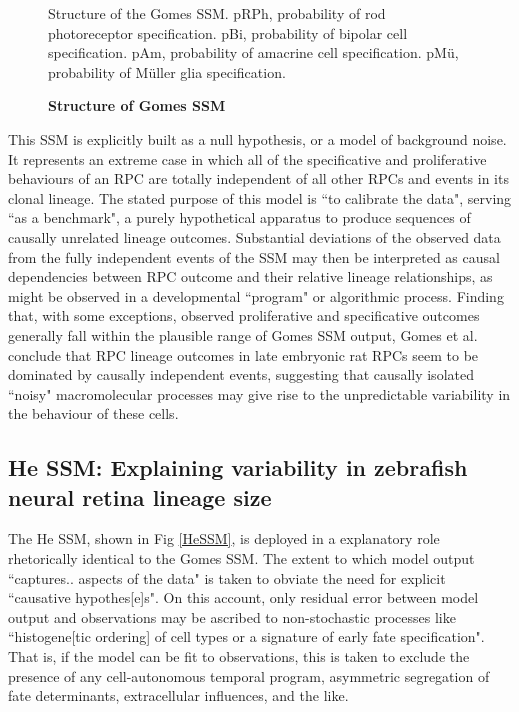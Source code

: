 \begin{figure}[!h]
\caption{{\bf Structure of Gomes SSM}}
Structure of the Gomes SSM. pRPh, probability of rod photoreceptor specification. pBi, probability of bipolar cell specification. pAm, probability of amacrine cell specification. pM{\"u}, probability of M{\"u}ller glia specification.
\label{GomesSSM}
\end{figure}
 
This SSM is explicitly built as a null hypothesis, or a model of background noise. It represents an extreme case in which all of the specificative and proliferative behaviours of an RPC are totally independent of all other RPCs and events in its clonal lineage. The stated purpose of this model is ``to calibrate the data", serving ``as a benchmark"\cite{Gomes2011}, a purely hypothetical apparatus to produce sequences of causally unrelated lineage outcomes. Substantial deviations of the observed data from the fully independent events of the SSM may then be interpreted as causal dependencies between RPC outcome and their relative lineage relationships, as might be observed in a developmental ``program" or algorithmic process. Finding that, with some exceptions, observed proliferative and specificative outcomes generally fall within the plausible range of Gomes SSM output, Gomes et al. conclude that RPC lineage outcomes in late embryonic rat RPCs seem to be dominated by causally independent events, suggesting that causally isolated ``noisy" macromolecular processes may give rise to the unpredictable variability in the behaviour of these cells. 
 
 \subsection{He SSM: Explaining variability in zebrafish neural retina lineage size}
 
The He SSM, shown in Fig \ref{HeSSM}, is deployed in a explanatory role rhetorically identical to the Gomes SSM. The extent to which model output ``captures.. aspects of the data" is taken to obviate the need for explicit ``causative hypothes[e]s". On this account, only residual error between model output and observations may be ascribed to non-stochastic processes like ``histogene[tic ordering] of cell types or a signature of early fate specification". That is, if the model can be fit to observations, this is taken to exclude the presence of any cell-autonomous temporal program, asymmetric segregation of fate determinants, extracellular influences, and the like. 

